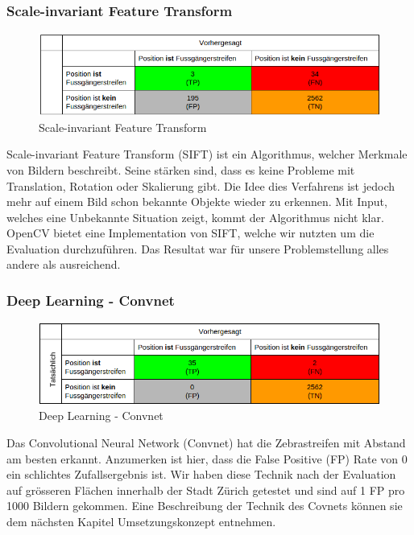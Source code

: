 \subsubsection{Scale-invariant Feature Transform}	
\begin{figure}[H]
\includegraphics[width=\textwidth]{images/sif_conf.png}
\caption[Scale-invariant Feature Transform]{Scale-invariant Feature Transform}
\end{figure}
Scale-invariant Feature Transform (SIFT) ist ein Algorithmus, welcher Merkmale von Bildern beschreibt. Seine stärken sind, dass es keine Probleme mit Translation, Rotation oder Skalierung gibt. Die Idee dies Verfahrens ist jedoch mehr auf einem Bild schon bekannte Objekte wieder zu erkennen. Mit Input, welches eine Unbekannte Situation zeigt, kommt der Algorithmus nicht klar.\\
OpenCV bietet eine Implementation von SIFT, welche wir nutzten um die Evaluation durchzuführen. Das Resultat war für unsere Problemstellung alles andere als ausreichend.
\subsubsection{Deep Learning - Convnet}	
\begin{figure}[H]
\includegraphics[width=\textwidth]{images/deep_conf.png}
\caption[Deep Learning]{Deep Learning - Convnet}
\end{figure}
Das Convolutional Neural Network (Convnet) hat die Zebrastreifen mit Abstand am besten erkannt. Anzumerken ist hier, dass die False Positive (FP) Rate von 0 ein schlichtes Zufallsergebnis ist. Wir haben diese Technik nach der Evaluation auf grösseren Flächen innerhalb der Stadt Zürich getestet und sind auf 1 FP pro 1000 Bildern gekommen. Eine Beschreibung der Technik des Covnets können sie dem nächsten Kapitel Umsetzungskonzept entnehmen.
\newpage

